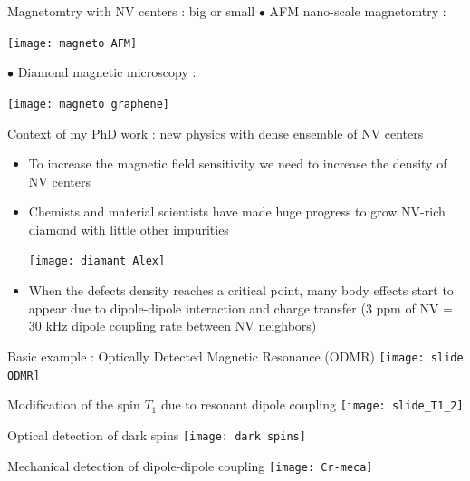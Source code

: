 \documentclass{beamer}
\begin{document}
\begin{frame}{Magnetomtry with NV centers : big or small}
$\bullet$ AFM nano-scale magnetomtry :
\begin{center}
\texttt{[image: magneto AFM]}
\end{center}


$\bullet$ Diamond magnetic microscopy :
\begin{center}
\texttt{[image: magneto graphene]}
\end{center}
\end{frame}

\begin{frame}{Context of my PhD work : new physics with dense ensemble of NV centers}
\begin{itemize}
\item To increase the magnetic field sensitivity we need to increase the density of NV centers
\item Chemists and material scientists have made huge progress to grow NV-rich diamond with little other impurities 
\begin{center}
\texttt{[image: diamant Alex]}
\end{center}
\item When the defects density reaches a critical point, many body effects start to appear due to dipole-dipole interaction and charge transfer (3 ppm of NV = 30 kHz dipole coupling rate between NV neighbors)
\end{itemize}
\end{frame}
\begin{frame}{Basic example : Optically Detected Magnetic Resonance (ODMR)}
\centering
\texttt{[image: slide ODMR]}
\end{frame}

\begin{frame}{Modification of the spin $T_1$ due to resonant dipole coupling}
\centering
\texttt{[image: slide\_T1\_2]}
\end{frame}

\begin{frame}{Optical detection of dark spins}
\centering
\texttt{[image: dark spins]}
\end{frame}

\begin{frame}{Mechanical detection of dipole-dipole coupling}
\centering
\texttt{[image: Cr-meca]}
\end{frame}
\end{document}
